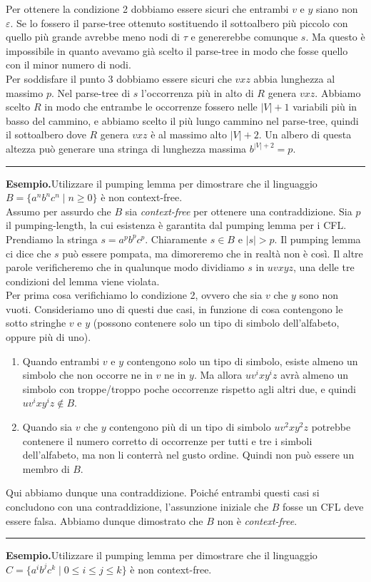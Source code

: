 \documentclass[italian]{article}
\newcommand{\linea}{\begin{center}\rule{5cm}{1pt}\end{center}}
\newcommand{\taleche}{\;|\;}
\newcommand{\len}[1]{\text{$|#1|$}}
\newcommand{\example}{\noindent\textbf{Esempio.\quad}}
\begin{document}
	\noindent
	Per ottenere la condizione 2 dobbiamo essere sicuri che entrambi $v$ e $y$ siano non $\varepsilon$. Se lo fossero il parse-tree ottenuto sostituendo il sottoalbero più piccolo con quello più grande avrebbe meno nodi di $\tau$ e genererebbe comunque $s$. Ma questo è impossibile in quanto avevamo già scelto il parse-tree in modo che fosse quello con il minor numero di nodi. \\
	
	\noindent
	Per soddisfare il punto 3 dobbiamo essere sicuri che $vxz$ abbia lunghezza al massimo $p$. Nel parse-tree di $s$ l'occorrenza più in alto di $R$ genera $vxz$. Abbiamo scelto $R$ in modo che entrambe le occorrenze fossero nelle $\len{V}+1$ variabili più in basso del cammino, e abbiamo scelto il più lungo cammino nel parse-tree, quindi il sottoalbero dove $R$ genera $vxz$ è al massimo alto $\len{V}+2$. Un albero di questa altezza può generare una stringa di lunghezza massima $b^{\len{V}+2} = p$. 
	
	\linea
	\example Utilizzare il pumping lemma per dimostrare che il linguaggio $B = \{ a^nb^nc^n \taleche n \geq 0 \}$ è non context-free. \\
	
	\noindent
	Assumo per assurdo che $B$ sia \textit{context-free} per ottenere una contraddizione. Sia $p$ il pumping-length, la cui esistenza è garantita dal pumping lemma per i CFL. Prendiamo la stringa $s = a^pb^pc^p$. Chiaramente $s \in B$ e $\len{s} > p$. Il pumping lemma ci dice che $s$ può essere pompata, ma dimoreremo che in realtà non è così. Il altre parole verificheremo che in qualunque modo dividiamo $s$ in $uvxyz$, una delle tre condizioni del lemma viene violata. \\
	Per prima cosa verifichiamo lo condizione 2, ovvero che sia $v$ che $y$ sono non vuoti. Consideriamo uno di questi due casi, in funzione di cosa contengono le sotto stringhe $v$ e $y$ (possono contenere solo un tipo di simbolo dell'alfabeto, oppure più di uno).
	\begin{enumerate}
		\item Quando entrambi $v$ e $y$ contengono solo un tipo di simbolo, esiste almeno un simbolo che non occorre ne in $v$ ne in $y$. Ma allora $uv^ixy^iz$ avrà almeno un simbolo con troppe/troppo poche occorrenze rispetto agli altri due, e quindi  $uv^ixy^iz \notin B$.
		\item Quando sia $v$ che $y$ contengono più di un tipo di simbolo  $uv^2xy^2z$ potrebbe contenere il numero corretto di occorrenze per tutti e tre i simboli dell'alfabeto, ma non li conterrà nel gusto ordine. Quindi  non può essere un membro di $B$. 
	\end{enumerate}
	Qui abbiamo dunque una contraddizione. Poiché entrambi questi casi si concludono con una contraddizione, l'assunzione iniziale che $B$ fosse un CFL deve essere falsa. Abbiamo dunque dimostrato che $B$ non è \textit{context-free}.
	\linea
	\example Utilizzare il pumping lemma per dimostrare che il linguaggio $C = \{ a^ib^jc^k \taleche 0 \leq i \leq j \leq k \}$ è non context-free. \\
	
\end{document}
